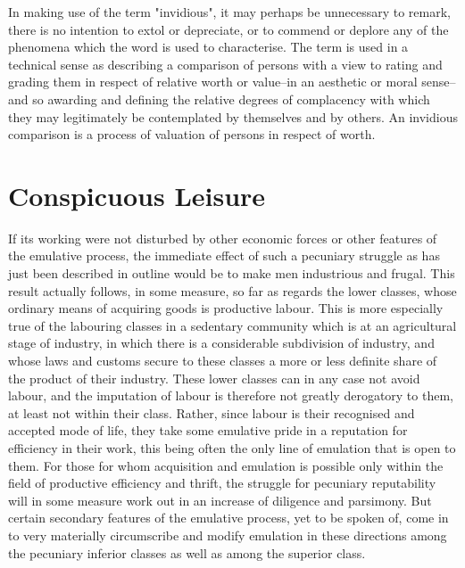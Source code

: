 \documentclass[12pt]{report}
\begin{document}
In making use of the term "invidious", it may perhaps be unnecessary to
remark, there is no intention to extol or depreciate, or to commend or
deplore any of the phenomena which the word is used to characterise. The
term is used in a technical sense as describing a comparison of persons
with a view to rating and grading them in respect of relative worth or
value--in an aesthetic or moral sense--and so awarding and defining
the relative degrees of complacency with which they may legitimately be
contemplated by themselves and by others. An invidious comparison is a
process of valuation of persons in respect of worth.




\chapter{Conspicuous Leisure}

If its working were not disturbed by other economic forces or other
features of the emulative process, the immediate effect of such a
pecuniary struggle as has just been described in outline would be to
make men industrious and frugal. This result actually follows, in some
measure, so far as regards the lower classes, whose ordinary means of
acquiring goods is productive labour. This is more especially true
of the labouring classes in a sedentary community which is at an
agricultural stage of industry, in which there is a considerable
subdivision of industry, and whose laws and customs secure to these
classes a more or less definite share of the product of their industry.
These lower classes can in any case not avoid labour, and the imputation
of labour is therefore not greatly derogatory to them, at least not
within their class. Rather, since labour is their recognised and
accepted mode of life, they take some emulative pride in a reputation
for efficiency in their work, this being often the only line of
emulation that is open to them. For those for whom acquisition and
emulation is possible only within the field of productive efficiency
and thrift, the struggle for pecuniary reputability will in some
measure work out in an increase of diligence and parsimony. But certain
secondary features of the emulative process, yet to be spoken of,
come in to very materially circumscribe and modify emulation in these
directions among the pecuniary inferior classes as well as among the
superior class.
\end{document}
